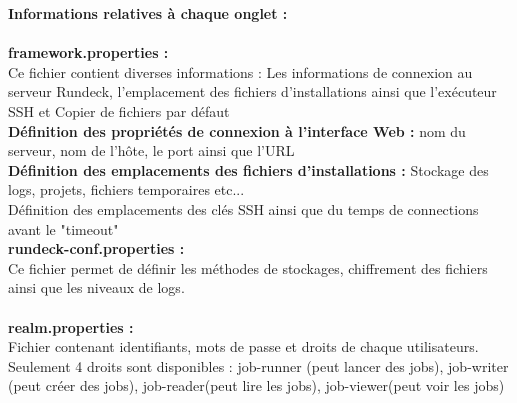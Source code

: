 \documentclass[12pt]{article}
\begin{document}
\textbf{Informations relatives à chaque onglet :}
\\
\vspace{0.5cm}
\\
\textbf{framework.properties :}
\\
Ce fichier contient diverses informations : Les informations de connexion au serveur Rundeck, l'emplacement des fichiers d'installations ainsi que l'exécuteur SSH et Copier de fichiers par défaut
\\
\textbf{Définition des propriétés de connexion à l'interface Web :} nom du serveur, nom de l'hôte, le port ainsi que l'URL
\\
\textbf{Définition des emplacements des fichiers d'installations :} Stockage des logs, projets, fichiers temporaires etc...
\\
Définition des emplacements des clés SSH ainsi que du temps de connections avant le "timeout"
\vspace{0.2cm}
\\
\textbf{rundeck-conf.properties :}
\\
Ce fichier permet de définir les méthodes de stockages, chiffrement des fichiers ainsi que les niveaux de logs.
\\
\vspace{0.2cm}
\\
\textbf{realm.properties :}
\\
Fichier contenant identifiants, mots de passe et droits de chaque utilisateurs.
\\
Seulement 4 droits sont disponibles : job-runner (peut lancer des jobs), job-writer (peut créer des jobs), job-reader(peut lire les jobs), job-viewer(peut voir les jobs)
\end{document}
